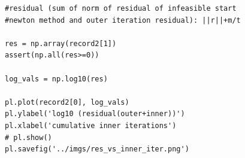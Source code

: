 \documentclass[12pt,letter]{article}
\begin{document}
\begin{enumerate}
\begin{itemize}
\begin{Verbatim}[fontsize=\small]
#residual (sum of norm of residual of infeasible start
#newton method and outer iteration residual): ||r||+m/t

res = np.array(record2[1])
assert(np.all(res>=0))

log_vals = np.log10(res)

pl.plot(record2[0], log_vals)
pl.ylabel('log10 (residual(outer+inner))')
pl.xlabel('cumulative inner iterations')
# pl.show()
pl.savefig('../imgs/res_vs_inner_iter.png')
\end{Verbatim}
  \end{itemize}
\end{enumerate}
\end{document}
